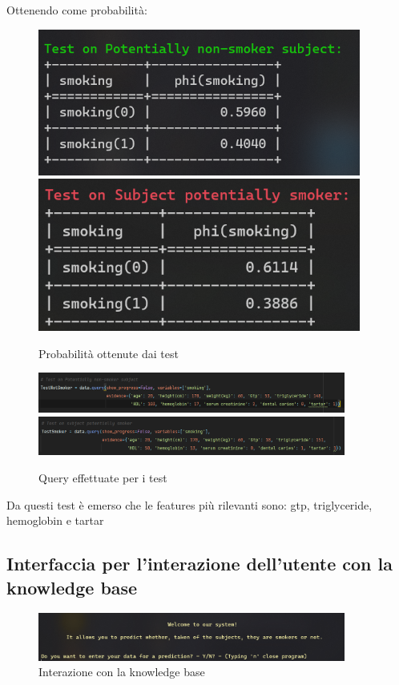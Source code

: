 \documentclass{article}
\begin{document}
\noindent
Ottenendo come probabilità:

\begin{figure}[H]
        \includegraphics[width=10.6cm]{prob1}
        \includegraphics[width=10.6cm]{prob2}
        \centering
        \caption{Probabilità ottenute dai test}
        \centering
\end{figure}

\begin{figure}[H]
        \includegraphics[width=0.9\textwidth]{query3}
        \includegraphics[width=0.9\textwidth]{query4}
        \centering
        \caption{Query effettuate per i test}
        \centering
\end{figure}
%

\noindent
Da questi test è emerso che le features più rilevanti sono: gtp, triglyceride, hemoglobin e tartar
\subsection{Interfaccia per l'interazione dell'utente con la knowledge base}

\begin{figure}[H]
        \includegraphics[width=0.9\textwidth]{welcome}
        \centering
        \caption{Interazione con la knowledge base}
        \centering
\end{figure}
\end{document}
